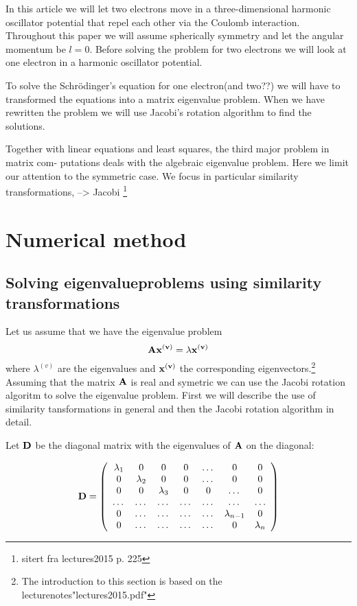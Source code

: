 \documentclass[11pt,a4wide]{article}
\begin{document}
In this article we will let two electrons move in a three-dimensional harmonic oscillator potential that repel each other via the Coulomb interaction.  Throughout this paper we will assume spherically symmetry and let the angular momentum be $l=0$. Before solving the problem for two electrons we will look at one electron in a harmonic oscillator potential. 

To solve the Schr\"odinger's equation for one electron(and two??) we will have to transformed the equations into a matrix eigenvalue problem. When we have rewritten the problem we will use Jacobi's rotation algorithm to find the solutions. %

Together with linear equations and least squares, the third major problem in matrix com- putations deals with the algebraic eigenvalue problem. Here we limit our attention to the symmetric case. We focus in particular similarity transformations, --> Jacobi \footnote{sitert fra lectures2015 p. 225}

\section{Numerical method}
\subsection{Solving eigenvalueproblems using similarity transformations}

Let us assume that we have the eigenvalue problem 
\[
\bf A \bf x^{(v)} = \lambda \bf x^{(v)}
\]
where $\lambda^{(v)}$ are the eigenvalues and $\bf x^{(v)}$ the corresponding eigenvectors.\footnote{The introduction to this section is based on the lecturenotes"lectures2015.pdf"} Assuming that the matrix $\bf A$ is real and symetric we can use the Jacobi rotation algoritm to solve the eigenvalue problem. First we will describe the use of similarity tansformations in general and then the Jacobi rotation algorithm in detail.

Let $\bf D$ be the diagonal matrix with the eigenvalues of $\bf A$ on the diagonal:

\begin{equation}
    \bf D = \left( \begin{array}{ccccccc} \lambda_1 & 0 & 0   & 0    & \dots  &0     & 0 \\
                                0  & \lambda_2 & 0 & 0    & \dots  &0     &0 \\
                                0   & 0 & \lambda_3 & 0  &0       &\dots & 0\\
                                \dots  & \dots & \dots & \dots  &\dots      &\dots & \dots\\
                                0   & \dots & \dots & \dots  &\dots       &\lambda_{n-1} & 0\\
                                0   & \dots & \dots & \dots  &\dots       &0 & \lambda_n

             \end{array} \right) 
      \label{eq:sematrix}
\end{equation} 
\end{document}
